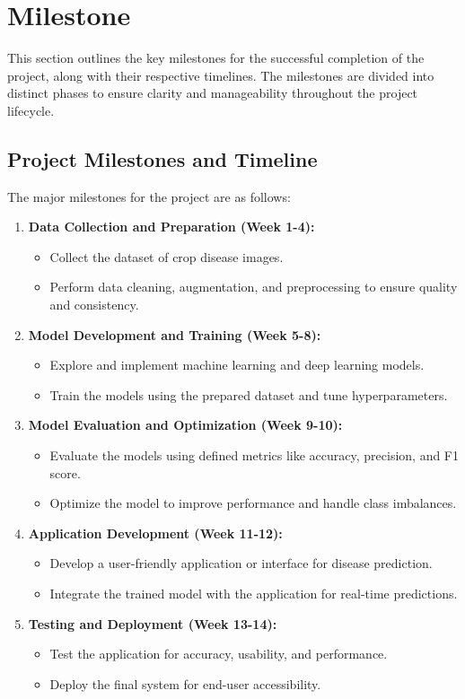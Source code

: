 \section{Milestone}
This section outlines the key milestones for the successful completion of the project, along with their respective timelines. The milestones are divided into distinct phases to ensure clarity and manageability throughout the project lifecycle.

\subsection{Project Milestones and Timeline}
The major milestones for the project are as follows:
\begin{enumerate}
    \item \textbf{Data Collection and Preparation (Week 1-4):}
    \begin{itemize}
        \item Collect the dataset of crop disease images.
        \item Perform data cleaning, augmentation, and preprocessing to ensure quality and consistency.
    \end{itemize}
    
    \item \textbf{Model Development and Training (Week 5-8):}
    \begin{itemize}
        \item Explore and implement machine learning and deep learning models.
        \item Train the models using the prepared dataset and tune hyperparameters.
    \end{itemize}
    
    \item \textbf{Model Evaluation and Optimization (Week 9-10):}
    \begin{itemize}
        \item Evaluate the models using defined metrics like accuracy, precision, and F1 score.
        \item Optimize the model to improve performance and handle class imbalances.
    \end{itemize}
    
    \item \textbf{Application Development (Week 11-12):}
    \begin{itemize}
        \item Develop a user-friendly application or interface for disease prediction.
        \item Integrate the trained model with the application for real-time predictions.
    \end{itemize}
    
    \item \textbf{Testing and Deployment (Week 13-14):}
    \begin{itemize}
        \item Test the application for accuracy, usability, and performance.
        \item Deploy the final system for end-user accessibility.
    \end{itemize}
\end{enumerate}

